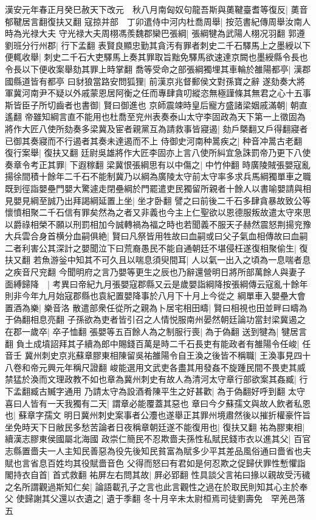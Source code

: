 漢安元年春正月癸巳赦天下改元　秋八月南匈奴句龍吾斯與薁鞬臺耆等復反|{
	薁音郁鞬居言翻復扶又翻}
寇掠并部　丁卯遣侍中河内杜喬周舉|{
	按范書紀傳周舉汝南人時為光禄大夫}
守光禄大夫周栩馮羨魏郡欒巴張綱|{
	張綱犍為武陽人栩况羽翻}
郭遵劉班分行州郡|{
	行下孟翻}
表賢良顯忠勤其貪汚有罪者刺史二千石驛馬上之墨綬以下便輒收舉|{
	刺史二千石大吏驛馬上奏其罪取旨黜免驛馬欲速達京闕也墨綬縣令長也令長以下便收案舉劾其罪上時掌翻}
喬等受命之部張綱獨埋其車輪於雒陽都亭|{
	漢郡國縣道皆有都亭}
曰豺狼當路安問狐狸|{
	前漢京兆督郵侯文對孫寶之辭}
遂劾奏大將軍冀河南尹不疑以外戚蒙恩居阿衡之任而專肆貪叨縱恣無極謹條其無君之心十五事斯皆臣子所切齒者也書御|{
	賢曰御進也}
京師震竦時皇后寵方盛諸梁姻戚滿朝|{
	朝直遙翻}
帝雖知綱言直不能用也杜喬至兖州表奏泰山太守李固政為天下第一上徵固為將作大匠八使所劾奏多梁冀及宦者親黨互為請救事皆寢遏|{
	劾戶槩翻又戶得翻寢者已御其奏寢而不行遏者其奏未達遏而不上}
侍御史河南种暠疾之|{
	种音冲暠古老翻}
復行案舉|{
	復扶又翻}
廷尉吳雄將作大匠李固亦上言八使所糾宜急誅罰帝乃更下八使奏章令考正其罪|{
	下遐稼翻}
梁冀恨張綱思有以中傷之|{
	中竹仲翻}
時廣陵賊張嬰寇亂揚徐間積十餘年二千石不能制冀乃以綱為廣陵太守前太守率多求兵馬綱獨單車之職既到徑詣嬰壘門嬰大驚遽走閉壘綱於門罷遣吏民獨留所親者十餘人以書喻嬰請與相見嬰見綱至誠乃出拜謁綱延置上坐|{
	坐才卧翻}
譬之曰前後二千石多肆貪暴故致公等懷憤相聚二千石信有罪矣然為之者又非義也今主上仁聖欲以恩德服叛故遣太守來思以爵祿相榮不願以刑罰相加今誠轉禍為福之時也若聞義不服天子赫然震怒荆揚兖豫大兵雲合身首横分血嗣俱絶|{
	賢曰凡祭皆用牲故曰血嗣或曰父子氣血相傳故曰血嗣}
二者利害公其深計之嬰聞泣下曰荒裔愚民不能自通朝廷不堪侵枉遂復相聚偷生|{
	復扶又翻}
若魚游釡中知其不可久且以喘息須臾間耳|{
	人以氣一出入之頃為一息喘者息之疾音尺兖翻}
今聞明府之言乃嬰等更生之辰也乃辭還營明日將所部萬餘人與妻子面縛歸降　|{
	考異曰帝紀九月張嬰寇郡縣又云是歲嬰詣綱降按張綱傳云寇亂十餘年則非今年九月始寇郡縣也袁紀置嬰降事於八月下十月上今從之}
綱單車入嬰壘大會置酒為樂|{
	樂音洛}
散遣部衆任從所之親為卜居宅相田疇|{
	賢曰相視也田並畔曰疇為于偽翻相息亮翻}
子孫欲為吏者皆引召之人情悦服南州晏然朝廷論功當封梁冀遏之在郡一歲卒|{
	卒子恤翻}
張嬰等五百餘人為之制服行喪|{
	為于偽翻}
送到犍為|{
	犍居言翻}
負土成墳詔拜其子續為郎中賜錢百萬是時二千石長吏有能政者有雒陽令任峻|{
	任音壬}
冀州刺史京兆蘇章膠東相陳留吳祐雒陽令自王渙之後皆不稱職|{
	王渙事見四十八卷和帝元興元年稱尺證翻}
峻能選用文武吏各盡其用發姦不旋踵民間不畏吏其威禁猛於渙而文理政教不如也章為冀州刺史有故人為清河太守章行部欲案其姦臧|{
	行下孟翻臧古贓字通用}
乃請太守為設酒肴陳平生之好甚歡|{
	為于偽翻好呼到翻}
太守喜曰人皆有一天我獨有二天|{
	謂章必能覆蓋其惡也}
章曰今夕蘇孺文與故人飲者私恩也|{
	蘇章字孺文}
明日冀州刺史案事者公灋也遂舉正其罪州境肅然後以摧折權豪忤旨坐免時天下日敝民多愁苦論者日夜稱章朝廷遂不能復用也|{
	復扶又翻}
祐為膠東相|{
	續漢志膠東侯國屬北海國}
政崇仁簡民不忍欺嗇夫孫性私賦民錢市衣以進其父|{
	百官志縣置嗇夫一人主知民善惡為役先後知民貧富為賦多少平其差品風俗通曰嗇省也夫賦也言省息百姓均其役賦嗇音色}
父得而怒曰有君如是何忍欺之促歸伏罪性慙懼詣閣持衣自首|{
	首式救翻}
祐屏左右問其故|{
	屛必郢翻}
性具談父言祐曰掾以親故受汚穢之名所謂觀過斯知仁矣|{
	論語載孔子之言也此言觀性之過在於取民則知其心主於奉父}
使歸謝其父還以衣遺之|{
	遺于季翻}
冬十月辛未太尉桓焉司徒劉壽免　罕羌邑落五

